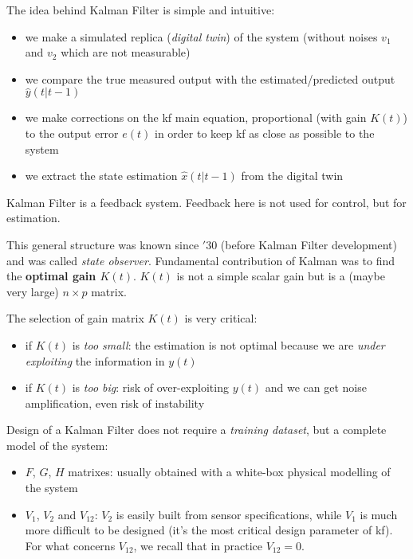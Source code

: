 The idea behind Kalman Filter is simple and intuitive:
\begin{itemize}
    \item we make a simulated replica (\emph{digital twin}) of the system (without noises $v_1$ and $v_2$ which are not measurable)
    \item we compare the true measured output with the estimated/predicted output $\hat{y}(t|t-1)$
    \item we make corrections on the \gls{kf} main equation, proportional (with gain $K(t)$) to the output error $e(t)$ in order to keep \gls{kf} as close as possible to the system 
    \item we extract the state estimation $\hat{x}(t|t-1)$ from the digital twin
\end{itemize}

\begin{obs}
    Kalman Filter is a feedback system.
    Feedback here is not used for control, but for estimation.
\end{obs}

This general structure was known since $'30$ (before Kalman Filter development) and was called \emph{state observer}.
Fundamental contribution of Kalman was to find the \textbf{optimal gain $K(t)$}.
$K(t)$ is not a simple scalar gain but is a (maybe very large) $n\times p$ matrix.

The selection of gain matrix $K(t)$ is very critical:
\begin{itemize}
    \item if $K(t)$ is \emph{too small}: the estimation is not optimal because we are \emph{under exploiting} the information in $y(t)$
    \item if $K(t)$ is \emph{too big}: risk of over-exploiting $y(t)$ and we can get noise amplification, even risk of instability
\end{itemize}

Design of a Kalman Filter does not require a \emph{training dataset}, but a complete model of the system:
\begin{itemize}
    \item $F$, $G$, $H$ matrixes: usually obtained with a white-box physical modelling of the system
    \item $V_1$, $V_2$ and $V_{12}$: $V_2$ is easily built from sensor specifications, while $V_1$ is much more difficult to be designed (it's the most critical design parameter of \gls{kf}). For what concerns $V_{12}$, we recall that in practice $V_{12}=0$. 
\end{itemize}

 